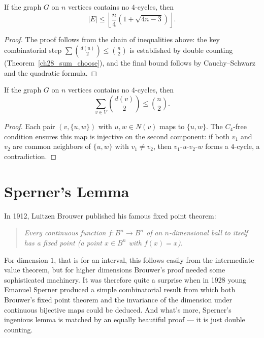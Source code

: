\begin{theorem}[Reiman]
  \label{ch28theorem}
  If the graph $G$ on $n$ vertices contains no $4$-cycles, then
  \[
  |E| \leq \left\lfloor \frac{n}{4}\left(1 + \sqrt{4n - 3}\right) \right\rfloor. \tag{6}
  \]
\end{theorem}
\begin{proof}
  \leanok
  The proof follows from the chain of inequalities above: the key combinatorial
  step $\sum \binom{d(u)}{2} \leq \binom{n}{2}$ is established by double counting
  (Theorem~\ref{ch28_sum_choose}), and the final bound follows by
  Cauchy--Schwarz and the quadratic formula.
\end{proof}

\begin{theorem}
  \label{ch28_sum_choose}
  \leanok
  If the graph $G$ on $n$ vertices contains no $4$-cycles, then
  \[
  \sum_{v \in V} \binom{d(v)}{2} \leq \binom{n}{2}.
  \]
\end{theorem}
\begin{proof}
  \leanok
  Each pair $(v, \{u, w\})$ with $u, w \in N(v)$ maps to $\{u, w\}$. The $C_4$-free
  condition ensures this map is injective on the second component: if both $v_1$
  and $v_2$ are common neighbors of $\{u, w\}$ with $v_1 \neq v_2$, then
  $v_1$-$u$-$v_2$-$w$ forms a $4$-cycle, a contradiction.
\end{proof}

\section{Sperner's Lemma}

In 1912, Luitzen Brouwer published his famous fixed point theorem:
\begin{quote}
\emph{Every continuous function $f : B^n \to B^n$ of an $n$-dimensional ball to
itself has a fixed point (a point $x \in B^n$ with $f(x) = x$).}
\end{quote}
For dimension $1$, that is for an interval, this follows easily from the intermediate
value theorem, but for higher dimensions Brouwer's proof needed some sophisticated
machinery. It was therefore quite a surprise when in 1928 young Emanuel Sperner
produced a simple combinatorial result from which both Brouwer's fixed point theorem
and the invariance of the dimension under continuous bijective maps could be deduced.
And what's more, Sperner's ingenious lemma is matched by an equally beautiful proof
--- it is just double counting.


